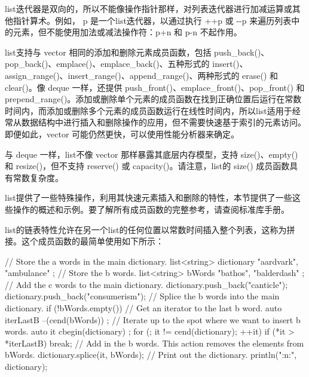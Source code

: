 
list迭代器是双向的，所以不能像操作指针那样，对列表迭代器进行加减运算或其他指针算术。例如， p 是一个list迭代器，以通过执行 ++p 或 -{}-p 来遍历列表中的元素，但不能使用加法或减法操作符：p+n 和 p-n 不起作用。


list支持与 vector 相同的添加和删除元素成员函数，包括 push\_back()、pop\_back()、emplace()、emplace\_back()、五种形式的 insert()、assign\_range()、insert\_range()、append\_range()、两种形式的 erase() 和 clear()。像 deque 一样，还提供 push\_front()、emplace\_front()、pop\_front() 和 prepend\_range()。添加或删除单个元素的成员函数在找到正确位置后运行在常数时间内，而添加或删除多个元素的成员函数运行在线性时间内，所以list适用于经常从数据结构中进行插入和删除操作的应用，但不需要快速基于索引的元素访问。即便如此，vector 可能仍然更快，可以使用性能分析器来确定。


与 deque 一样，list不像 vector 那样暴露其底层内存模型，支持 size()、empty() 和 resize()，但不支持 reserve() 或 capacity()。请注意，list的 size() 成员函数具有常数复杂度。


list提供了一些特殊操作，利用其快速元素插入和删除的特性，本节提供了一些这些操作的概述和示例。要了解所有成员函数的完整参考，请查阅标准库手册。


list的链表特性允许在另一个list的任何位置以常数时间插入整个列表，这称为拼接。这个成员函数的最简单使用如下所示：

\begin{cpp}
// Store the a words in the main dictionary.
list<string> dictionary { "aardvark", "ambulance" };
// Store the b words.
list<string> bWords { "bathos", "balderdash" };
// Add the c words to the main dictionary.
dictionary.push_back("canticle");
dictionary.push_back("consumerism");
// Splice the b words into the main dictionary.
if (!bWords.empty()) {
    // Get an iterator to the last b word.
    auto iterLastB { --(cend(bWords)) };
    // Iterate up to the spot where we want to insert b words.
    auto it { cbegin(dictionary) };
    for (; it != cend(dictionary); ++it) {
        if (*it > *iterLastB) { break; }
    }
    // Add in the b words. This action removes the elements from bWords.
    dictionary.splice(it, bWords);
}
// Print out the dictionary.
println("{:n:}", dictionary);
\end{cpp}

